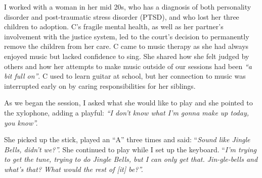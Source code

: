 \documentclass[authordate, empirical]{jote-new-article}
\begin{document}
	I worked with a woman in her mid 20s, who has a diagnosis of both personality disorder and post-traumatic stress disorder (PTSD), and who lost her three children to adoption. C's fragile mental health, as well as her partner's involvement with the justice system, led to the court's decision to permanently remove the children from her care. C came to music therapy as she had always enjoyed music but lacked confidence to sing. She shared how she felt judged by others and how her attempts to make music outside of our sessions had been \emph{“a bit full on”}. C used to learn guitar at school, but her connection to music was interrupted early on by caring responsibilities for her siblings.







	As we began the session, I asked what she would like to play and she pointed to the xylophone, adding a playful: \emph{“I don't know what I'm gonna make up today, you know”. }



	She picked up the stick, played an “A” three times and said: “\emph{Sound like Jingle Bells, didn't we?”. }She continued to play while I set up the keyboard. “\emph{I'm trying to get the tune, trying to do Jingle Bells, but I can only get that. Jin-gle-bells and what's that? What would the rest of [it] be?”.}
\end{document}
